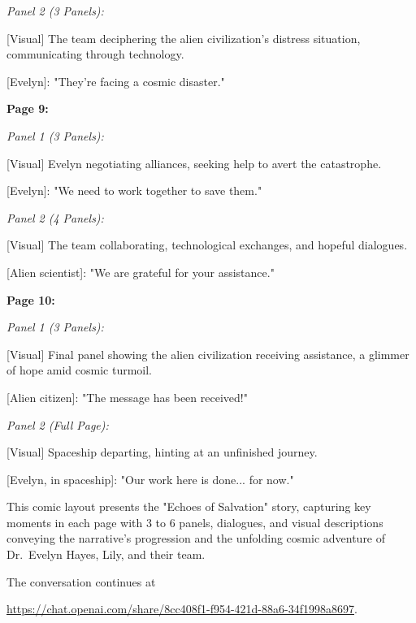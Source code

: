 \begin{aquote}
    \noindent\emph{Panel 2 (3 Panels):}

    [Visual] The team deciphering the alien civilization's distress situation, communicating through technology.

    [Evelyn]: "They're facing a cosmic disaster."\medskip

    \noindent\textbf{Page 9:}\smallskip

    \noindent\emph{Panel 1 (3 Panels):}

    [Visual] Evelyn negotiating alliances, seeking help to avert the catastrophe.

    [Evelyn]: "We need to work together to save them."\smallskip

    \noindent\emph{Panel 2 (4 Panels):}

    [Visual] The team collaborating, technological exchanges, and hopeful dialogues.

    [Alien scientist]: "We are grateful for your assistance."\medskip

    \noindent\textbf{Page 10:}\smallskip

    \noindent\emph{Panel 1 (3 Panels):}

    [Visual] Final panel showing the alien civilization receiving assistance, a glimmer of hope amid cosmic turmoil.

    [Alien citizen]: "The message has been received!"\smallskip

    \noindent\emph{Panel 2 (Full Page):}

    [Visual] Spaceship departing, hinting at an unfinished journey.

    [Evelyn, in spaceship]: "Our work here is done... for now."\medskip

    This comic layout presents the "Echoes of Salvation" story, capturing key moments in each page with 3 to 6 panels, dialogues, and visual descriptions conveying the narrative's progression and the unfolding cosmic adventure of Dr.~Evelyn Hayes, Lily, and their team.
\end{aquote}
The conversation continues at 

\noindent\url{https://chat.openai.com/share/8cc408f1-f954-421d-88a6-34f1998a8697}.
